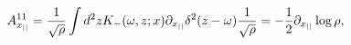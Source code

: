 \begin{equation}
A_{x_{||}}^{11}={1\over{\sqrt{\rho}}}\int d^2z
K_-(\omega,z;x)\partial_{x_{||}}\delta^2(z-\omega){1\over{\sqrt{\rho}}}=
-{1\over2}\partial_{x_{||}}\log\rho,
\end{equation}

